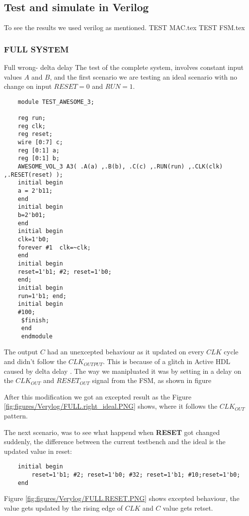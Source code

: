 \subsection{Test and simulate in Verilog}
To see the results we used verilog as mentioned.
{TEST MAC.tex}
{TEST FSM.tex}
\subsubsection{FULL SYSTEM}
Full wrong- delta delay
The test of the complete system, involves constant input values $A$ and $B$, and the first scenario we are testing an ideal scenario with no change on input $RESET=0$ and $RUN=1$.

\begin{lstlisting}
    module TEST_AWESOME_3;
    
	reg run;
	reg clk;
	reg reset;
	wire [0:7] c;
	reg [0:1] a;
	reg [0:1] b;
	AWESOME_VOL_3 A3( .A(a) ,.B(b), .C(c) ,.RUN(run) ,.CLK(clk) ,.RESET(reset) );	
	initial begin
    a = 2'b11;
    end	  
	initial begin
    b=2'b01;
	end	
	initial begin
    clk=1'b0;
    forever #1	clk=~clk;
	end
	initial begin
    reset=1'b1; #2; reset=1'b0;
	end;
	initial begin  
    run=1'b1; end;
	initial begin
    #100;
     $finish;
	 end
	 endmodule
	\end{lstlisting}

	The output $C$ had an unexcepted behaviour as it updated on every $CLK$ cycle and didn't follow the $CLK_{OUTPUT}$. This is because of a glitch in Active HDL caused by delta delay \cite{delta}. The way we manipluated it was by setting in a delay on the $CLK_{OUT}$ and $RESET_{OUT}$ signal from the FSM, as shown in figure
	

	After this modification we got an excepted result as the Figure \ref{fig:figures/Verylog/FULL.right_ideal.PNG} shows, where it follows the $CLK_{OUT}$ pattern.

The next scenario, was to see what happend when \textbf{RESET} got changed suddenly, the difference between the current testbench and the ideal is the updated value in reset:

\begin{lstlisting}
	initial begin
		reset=1'b1; #2; reset=1'b0; #32; reset=1'b1; #10;reset=1'b0;
	end
\end{lstlisting}
Figure \ref{fig:figures/Verylog/FULL.RESET.PNG} shows excepted behaviour, the value gets updated by the rising edge of $CLK$ and $C$ value gets retset.

